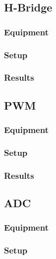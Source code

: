 \subsection{H-Bridge}

\subsubsection{Equipment}

\subsubsection{Setup}

\subsubsection{Results}

\subsection{PWM}

\subsubsection{Equipment}

\subsubsection{Setup}

\subsubsection{Results}

\subsection{ADC}

\subsubsection{Equipment}
 
\subsubsection{Setup}
 
